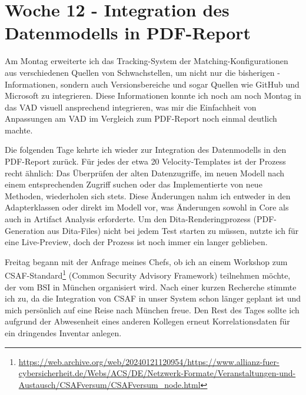 \section{Woche 12 - Integration des Datenmodells in PDF-Report} \label{sec:bericht-wo-12}


\lweekdaymarginpar{\weekdayMondayLong}

Am Montag erweiterte ich das Tracking-System der Matching-Konfigurationen aus verschiedenen Quellen von Schwachstellen, um nicht nur die bisherigen -Informationen, sondern auch Versionsbereiche und sogar Quellen wie GitHub und Microsoft zu integrieren.
Diese Informationen konnte ich noch am noch Montag in das VAD visuell ansprechend integrieren, was mir die Einfachheit von Anpassungen am VAD im Vergleich zum PDF-Report noch einmal deutlich machte.

\sweekdaymarginpar{\weekdayTuesdayShort\ - \weekdayThursdayShort}

Die folgenden Tage kehrte ich wieder zur Integration des Datenmodells in den PDF-Report zurück.
Für jedes der etwa 20 Velocity-Templates ist der Prozess recht ähnlich:
Das Überprüfen der alten Datenzugriffe, im neuen Modell nach einem entsprechenden Zugriff suchen oder das Implementierte von neue Methoden, wiederholen sich stets.
Diese Änderungen nahm ich entweder in den Adapterklassen oder direkt im Modell vor, was Änderungen sowohl in Core als auch in Artifact Analysis erforderte.
Um den Dita-Renderingprozess (PDF-Generation aus Dita-Files) nicht bei jedem Test starten zu müssen, nutzte ich  für eine Live-Preview, doch der Prozess ist noch immer ein langer geblieben.

\sweekdaymarginpar{\weekdayFridayLong}

Freitag begann mit der Anfrage meines Chefs, ob ich an einem Workshop zum CSAF-Standard\footnote{\url{https://web.archive.org/web/20240121120954/https://www.allianz-fuer-cybersicherheit.de/Webs/ACS/DE/Netzwerk-Formate/Veranstaltungen-und-Austausch/CSAFversum/CSAFversum_node.html}} (Common Security Advisory Framework) teilnehmen möchte, der vom BSI in München organisiert wird.
Nach einer kurzen Recherche stimmte ich zu, da die Integration von CSAF in unser System schon länger geplant ist und mich persönlich auf eine Reise nach München freue.
Den Rest des Tages sollte ich aufgrund der Abwesenheit eines anderen Kollegen erneut Korrelationsdaten für ein dringendes Inventar anlegen.
